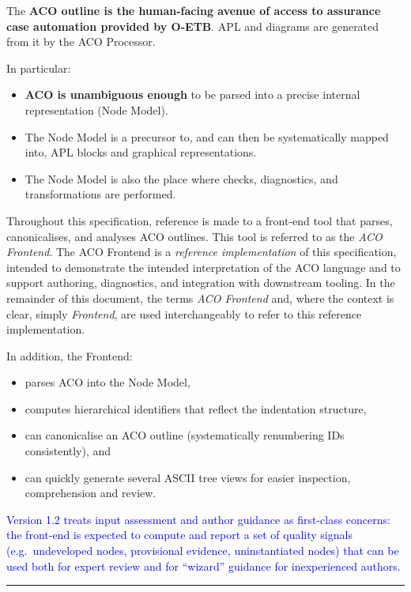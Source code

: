 \documentclass[11pt]{article}
\begin{document}
The \textbf{ACO outline is the human-facing avenue of access to assurance case automation provided by O-ETB}.
APL and diagrams are generated from it by the ACO Processor.

In particular:
\begin{itemize}[leftmargin=2em]
  \item \textbf{ACO is unambiguous enough} to be parsed into a precise internal representation (Node Model).
  \item The Node Model is a precursor to, and can then be systematically mapped into, APL blocks and graphical representations.
  \item The Node Model is also the place where checks, diagnostics, and transformations are performed.
\end{itemize}

Throughout this specification, reference is made to a front-end tool that parses,
canonicalises, and analyses ACO outlines. This tool is referred to as the
\emph{ACO Frontend}. The ACO Frontend is a \emph{reference implementation} of this
specification, intended to demonstrate the intended interpretation of the ACO
language and to support authoring, diagnostics, and integration with downstream
tooling.
In the remainder of this document, the terms \emph{ACO Frontend} and, where the
context is clear, simply \emph{Frontend}, are used interchangeably to refer to
this reference implementation.

In addition, the Frontend:
\begin{itemize}[leftmargin=2em]
  \item parses ACO into the Node Model,
  \item computes hierarchical identifiers that reflect the indentation structure,
  \item can canonicalise an ACO outline (systematically renumbering IDs consistently), and
  \item can quickly generate several ASCII tree views for easier inspection, comprehension and review.
\end{itemize}

\textcolor{blue}{Version 1.2 treats input assessment and author guidance as first-class concerns: the front-end is expected to compute and report a set of quality signals (e.g.\ undeveloped nodes, provisional evidence, uninstantiated nodes) that can be used both for expert review and for ``wizard'' guidance for inexperienced authors.}

\bigskip
\hrule
\bigskip
\end{document}
